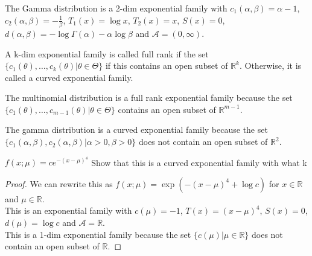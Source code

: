 \documentclass[answers,12pt,addpoints]{exam}
\begin{document}
\begin{example}
    [Gamma]
    The Gamma distribution is a 2-dim exponential family with $c_1(\alpha,\beta) = \alpha - 1$, $c_2(\alpha,\beta) = -\frac{1}{\beta}$, $T_1(x) = \log x$, $T_2(x) = x$, $S(x) = 0$, $d(\alpha,\beta) = -\log \Gamma(\alpha) - \alpha \log \beta$ and $\mathcal{A} = (0,\infty)$.
\end{example}
\begin{definition}
    A k-dim exponential family is called full rank if the set $\{c_1(\theta), \ldots, c_k(\theta) | \theta \in \Theta\}$ if this contains an open subset of $\mathbb{R}^k$. Otherwise, it is called a curved exponential family.
\end{definition}
\begin{example}
    [Multinomial] The multinomial distribution is a full rank exponential family because the set $\{c_1(\theta), \ldots, c_{m-1}(\theta) | \theta \in \Theta\}$ contains an open subset of $\mathbb{R}^{m-1}$.
\end{example}
\begin{example}
    [Gamma] The gamma distribution is a curved exponential family because the set $\{c_1(\alpha,\beta), c_2(\alpha,\beta) | \alpha > 0, \beta > 0\}$ does not contain an open subset of $\mathbb{R}^2$.
\end{example}
\begin{remark}
    $f(x;\mu) = ce^{-(x-\mu)^4}$ 
    Show that this is a curved exponential family with what k
    \begin{proof}
        We can rewrite this as $f(x;\mu) = \exp\left( - (x-\mu)^4 + \log c \right)$ for $x \in \mathbb{R}$ and $\mu \in \mathbb{R}$.\\
        This is an exponential family with $c(\mu) = -1$, $T(x) = (x-\mu)^4$, $S(x) = 0$, $d(\mu) = \log c$ and $\mathcal{A} = \mathbb{R}$.\\
        This is a 1-dim exponential family because the set $\{c(\mu) | \mu \in \mathbb{R}\}$ does not contain an open subset of $\mathbb{R}$.
    \end{proof}
\end{remark}
\end{document}
